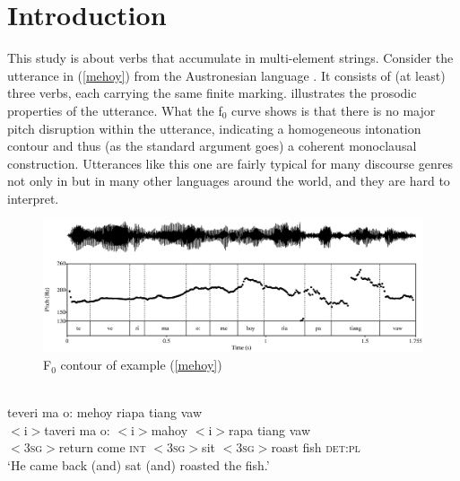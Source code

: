\chapter{Introduction}
\label{ch:introduction}
This study is about verbs that accumulate in multi-element strings. Consider the utterance in (\ref{mehoy}) from the Austronesian language . It consists of (at least) three verbs, each carrying the same finite marking.  illustrates the pro\-sod\-ic properties of the utterance. What the f$_0$ curve shows is that there is no major pitch disruption within the utterance, indicating a homogeneous intonation contour and thus (as the standard argument goes) a coherent monoclausal construction. Utterances like this one are fairly typical for many discourse genres not only in  but in many other languages around the world, and they are hard to interpret.

\begin{figure}
\begin{center}
\includegraphics[width=1.0\textwidth]{figures/mehoy.eps} 
\caption{F$_0$ contour of example (\ref{mehoy})}\label{fig:ex1_pitch}
\end{center}
\end{figure}

\ea \label{mehoy}
\\
\glll teveri ma o: mehoy riapa tiang vaw\\
$<$i$>$taveri ma o: $<$i$>$mahoy $<$i$>$rapa tiang vaw\\
$<$3\textsc{sg}$>$return come \textsc{int} $<$3\textsc{sg}$>$sit $<$3\textsc{sg}$>$roast fish \textsc{det}:\textsc{pl}\\
\glt ‘He came back (and) sat (and) roasted the fish.’
\z

